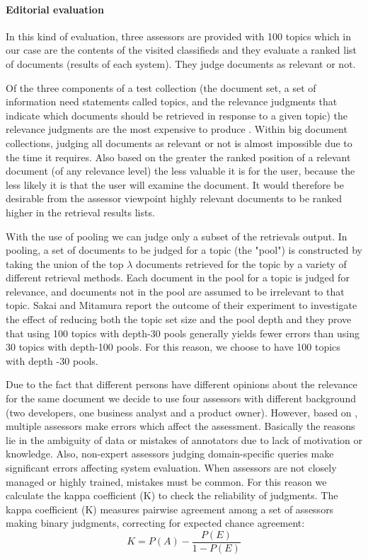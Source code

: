 \paragraph{Editorial evaluation}

In this kind of evaluation, three assessors are provided with 100 topics which in our case are the contents of the visited classifieds and they evaluate a ranked list of documents (results of each system). They judge documents as relevant or not.

Of the three components of a test collection (the document set, a set of information need statements called topics, and the relevance judgments that indicate which documents should be retrieved in response to a given topic) the relevance judgments are the most expensive to produce \cite{BuckleyDimmick}. Within big document collections, judging all documents as relevant or not is  almost impossible due to the time it requires. Also based on \cite{KalervoKekalainen} the greater the ranked position of a relevant document (of any relevance level) the less valuable it is for the user, because the less likely it is that the user will examine the document. It would therefore be desirable from the assessor viewpoint highly relevant documents to be ranked higher in the retrieval results lists.

With the use of pooling we can judge only a subset of the retrievals output. In pooling, a set of documents to be judged for a topic (the "pool") is constructed by taking the union of the top $\lambda$ documents retrieved for the topic by a variety of different retrieval methods. Each document in the pool for a topic is judged for relevance, and documents not in the pool are assumed to be irrelevant to that topic.
Sakai and Mitamura \cite{SakaiMitamura} report the outcome of their experiment to investigate the effect of reducing both the topic set size and the pool depth and they prove that using 100 topics with depth-30 pools generally yields fewer errors than using 30 topics with depth-100 pools. For this reason, we choose to have 100 topics with depth -30 pools.


Due to the fact that different persons have different opinions about the relevance for the same document we decide to use four assessors with different background (two developers, one business analyst and a product owner). However, based on \cite{MaskariSandersonClough}, multiple assessors make errors which affect the assessment. Basically the reasons lie in the ambiguity of data or mistakes of annotators due to lack of motivation or knowledge. Also, non-expert assessors judging domain-specific queries make significant errors affecting system evaluation. When assessors are not closely managed or highly trained, mistakes must be common. For this reason we calculate the kappa coefficient (K) to check the reliability of judgments.
The kappa coefficient (K) measures pairwise agreement among a set of assessors making binary judgments, correcting for expected chance agreement:
\begin{equation}
K= P(A) - \frac{P(E)} {1-P(E)}
\end{equation}

